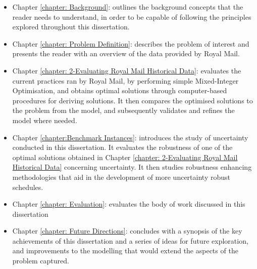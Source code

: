 \vspace{\baselineskip}
\begin{itemize}
	\item Chapter \ref{chapter: Background}: outlines the background concepts that the reader needs to understand, in order to be capable of following the principles explored throughout this dissertation.\par

	\item Chapter \ref{chapter: Problem Definition}: describes the problem of interest and presents the reader with an overview of the data provided by Royal Mail. \par

	\item Chapter \ref{chapter: 2-Evaluating Royal Mail Historical Data}: evaluates the current practices ran by Royal Mail, by performing simple Mixed-Integer Optimisation, and obtains optimal solutions through computer-based procedures for deriving solutions. It then compares the optimised solutions to the problem from the model, and subsequently validates and refines the model where needed.\par

    \item Chapter \ref{chapter:Benchmark Instances}: introduces the study of uncertainty conducted in this dissertation. It evaluates the robustness of one of the optimal solutions obtained in Chapter \ref{chapter: 2-Evaluating Royal Mail Historical Data} concerning uncertainty. It then studies robustness enhancing methodologies that aid in the development of more uncertainty robust schedules.   \par

	\item Chapter \ref{chapter: Evaluation}: evaluates the body of work discussed in this dissertation\par

	\item Chapter \ref{chapter: Future Directions}: concludes with a synopsis of the key achievements of this dissertation and a series of ideas for future exploration, and improvements to the modelling that would extend the aspects of the problem captured.
\end{itemize}\par





